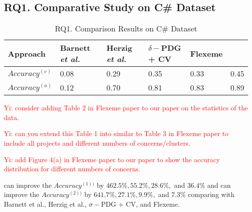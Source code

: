 \subsection{RQ1. Comparative Study on C\# Dataset}
\label{rq1:sec}

\begin{table}[t]
	\caption{RQ1. Comparison Results on C\# Dataset}
	\vspace{-0.1in}
	\begin{center}
		\footnotesize
		\tabcolsep 4pt
		\renewcommand{\arraystretch}{1} \begin{tabular}{p{1.4cm}<{\centering}|p{1.3cm}<{\centering}p{1.2cm}<{\centering}p{1.4cm}<{\centering}p{0.8cm}<{\centering}|p{0.7cm}<{\centering}}
			
			\hline
			Approach          & Barnett {\em et al.} & Herzig {\em et al.} & $\delta-$PDG + CV & Flexeme & {\tool}\\
			\hline
			$Accuracy^{(c)}$   &        0.08    &		0.29	&		0.35      & 0.33	& 0.45     \\
			$Accuracy^{(a)}$   &        0.12    &		0.70	&		0.81	  & 0.83    & 0.89      \\
			\hline
		\end{tabular}
		\label{RQ1-result}
	\end{center}
\end{table}

\textcolor{red}{Yi: consider adding Table 2 in Flexeme paper to our paper on the statistics of the data}.

\textcolor{red}{Yi: can you extend this Table 1 into similar to Table 3 in Flexeme paper to include all projects and different numbers of concerns/clusters.}

\textcolor{red}{Yi: add Figure 4(a) in Flexeme paper to our paper to show
  the accuracy distribution for different numbers of concerns.}

\tool can improve the $Accuracy^{(1))}$ by $462.5\%, 55.2\%, 28.6\%, $ and $36.4\%$ and can improve the  $Accuracy^{(2))}$ by $641.7\%, 27.1\%, 9.9\%, $ and $7.3\%$ comparing with Barnett et al., Herzig et al., $\sigma-$PDG + CV, and Flexeme.
